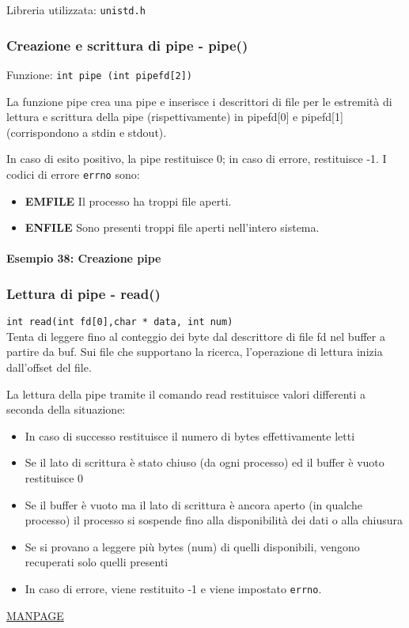        Libreria utilizzata: \texttt{unistd.h}
        \subsubsection{Creazione e scrittura di pipe - pipe()}
        Funzione: \texttt{int pipe (int pipefd[2])}
        
        La funzione pipe crea una pipe e inserisce i descrittori di file per le estremità di lettura e scrittura della pipe (rispettivamente) in pipefd[0] e pipefd[1] (corrispondono a stdin e stdout).

         In caso di esito positivo, la pipe restituisce 0; in caso di errore, restituisce -1. I codici di errore \texttt{errno} sono:
    \begin{itemize}
        \item \textbf{EMFILE} Il processo ha troppi file aperti.
        \item \textbf{ENFILE} Sono presenti troppi file aperti nell'intero sistema.
    \end{itemize}

    \paragraph{Esempio 38: Creazione pipe} \hfill \break{}

    
    \subsubsection{Lettura di pipe - read()}
    \texttt{int read(int fd[0],char * data, int num)}\\
    Tenta di leggere fino al conteggio dei byte dal descrittore di file fd nel buffer a partire da buf.
    Sui file che supportano la ricerca, l'operazione di lettura inizia dall'offset del file.
        
    
    La lettura della pipe tramite il comando read restituisce valori differenti a seconda della situazione:
    \begin{itemize}
        \item In caso di successo restituisce il numero di bytes effettivamente letti
        \item Se il lato di scrittura è stato chiuso (da ogni processo) ed il buffer è vuoto restituisce 0
        \item Se il buffer è vuoto ma il lato di scrittura è ancora aperto (in qualche processo) il processo si sospende fino alla disponibilità dei dati o alla chiusura
        \item Se si provano a leggere più bytes (num) di quelli disponibili, vengono recuperati solo quelli presenti
        \item In caso di errore, viene restituito -1 e viene impostato \texttt{errno}.
    \end{itemize}
    \href{https://man7.org/linux/man-pages/man2/read.2.html}{MANPAGE}
    
